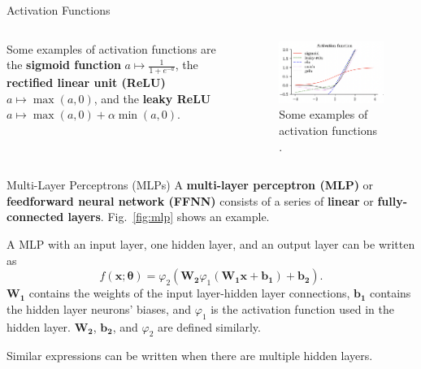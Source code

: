 \documentclass{beamer}
\begin{document}
\begin{frame}{Activation Functions}
    \begin{columns}
            Some examples of activation functions are the \textbf{sigmoid function} $a \mapsto \frac{1}{1 + e^{-a}}$, the \textbf{rectified linear unit (ReLU)} $a \mapsto \max(a, 0)$, and the \textbf{leaky ReLU} $a \mapsto\max(a, 0) + \alpha\min(a, 0)$.
            \begin{figure}
                \centering
                \includegraphics[scale=0.5]{activation_functions}
                \caption{Some examples of activation functions \cite{pml2Book}.}
                \label{fig:activation_functions}
            \end{figure}
    \end{columns}
\end{frame}

\begin{frame}{Multi-Layer Perceptrons (MLPs)}
    A \textbf{multi-layer perceptron (MLP)} or \textbf{feedforward neural network (FFNN)} consists of a series of \textbf{linear} or \textbf{fully-connected layers}. Fig.~\ref{fig:mlp} shows an example.
    
    \medskip
    
    A MLP with an input layer, one hidden layer, and an output layer can be written as
    \[
    f(\boldsymbol{x}; \boldsymbol{\theta}) = \varphi_2(\boldsymbol{W_2}\varphi_1(\boldsymbol{W_1}\boldsymbol{x} + \boldsymbol{b_1}) + \boldsymbol{b_2}).
    \]
    $\boldsymbol{W_1}$ contains the weights of the input layer-hidden layer connections, $\boldsymbol{b_1}$ contains the hidden layer neurons' biases, and $\varphi_1$ is the activation function used in the hidden layer. $\boldsymbol{W_2}$, $\boldsymbol{b_2}$, and $\varphi_2$ are defined similarly.
    
    \medskip
    
    Similar expressions can be written when there are multiple hidden layers.
\end{frame}
\end{document}

